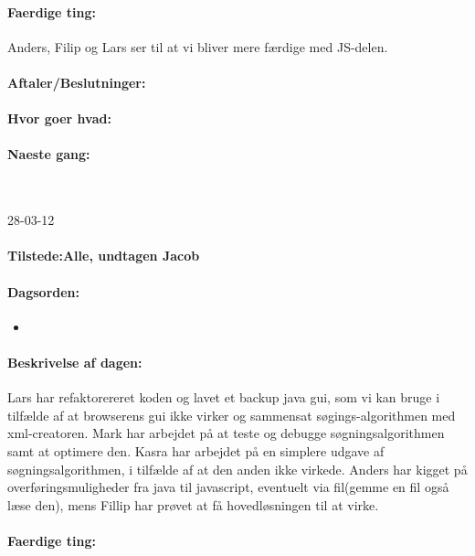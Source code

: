 \documentclass[a4paper,10pt,titlepage]{article}
\begin{document}
		\paragraph{Faerdige ting:}
		Anders, Filip og Lars ser til at vi bliver mere færdige med JS-delen.
		\paragraph{Aftaler/Beslutninger:}
		
		\paragraph{Hvor goer hvad:}
		
		\paragraph{Naeste gang:}\mbox{}\\
		
		\begin{center}
		28-03-12
		\end{center}
		
		\paragraph{Tilstede:Alle, undtagen Jacob}
		\paragraph{Dagsorden:}
		\begin{itemize}
					\item 
					
		\end{itemize}
		
		\paragraph{Beskrivelse af dagen:}
		Lars har refaktorereret koden og lavet et backup java gui, som vi kan bruge i tilfælde af at browserens gui ikke virker og sammensat søgings-algorithmen med xml-creatoren.
Mark har arbejdet på at teste og debugge søgningsalgorithmen samt at optimere den. Kasra har arbejdet på en simplere udgave af søgningsalgorithmen, i tilfælde af at den anden ikke virkede.
Anders har kigget på overføringsmuligheder fra java til javascript, eventuelt via fil(gemme en fil også læse den), mens Fillip har prøvet at få hovedløsningen til at virke.

		\paragraph{Faerdige ting:}
		
\end{document}
